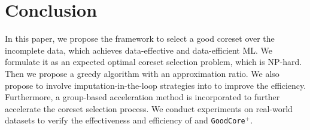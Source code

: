 \section{Conclusion}

In this paper, we propose the \ours framework to select a good coreset over the incomplete data, which achieves data-effective and data-efficient ML. We formulate it as an expected optimal coreset selection problem, which is NP-hard. Then we propose a greedy algorithm with an approximation ratio. We also propose to involve imputation-in-the-loop strategies into \ours to  improve the efficiency. Furthermore, a group-based acceleration method is incorporated to further accelerate the coreset selection process. We conduct experiments on real-world datasets to verify the effectiveness and efficiency of \ours and \texttt{GoodCore}$^+$.
